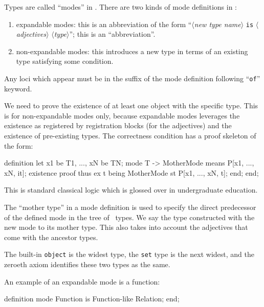 \begin{node}[Modes]\label{mizar-000S}%
Types are called ``modes'' in \Mizar. There are two kinds of mode
definitions in \Mizar:
\begin{enumerate}
\item expandable modes: this is an abbreviation of the form
  ``$\langle$\textit{new type name}$\rangle$ \texttt{is} $\langle$\textit{adjectives}$\rangle$
  $\langle$\textit{type}$\rangle$''; this is an ``abbreviation''.
\item non-expandable modes: this introduces a new type in terms of an
  existing type satisfying some condition.
\end{enumerate}
Any loci which appear must be in the suffix of the mode definition
following ``\texttt{of}'' keyword.

\begin{node}\label{mizar-000X}%
We need to prove the existence of at least one object with the specific type.
This is for non-expandable modes only, because expandable modes
leverages the existence as registered by registration blocks (for the
adjectives) and the existence of pre-existing types. The correctness
condition has a proof skeleton of the form:
\begin{mizar}
definition
  let x1 be T1, ..., xN be TN;
  mode T -> MotherMode means P[x1, ..., xN, it];
  existence
  proof
    thus ex t being MotherMode st P[x1, ..., xN, t];
  end;
end;
\end{mizar}
This is standard classical logic which is glossed over in undergraduate education.
\end{node}

\begin{node}[Widening]\label{mizar-000Y}%
The ``mother type'' in a mode definition is used to specify the direct
predecessor of the defined mode in the tree of \Mizar\ types. We say the
type constructed with the new mode  to its mother
type. This also takes into account the adjectives that come with the
ancestor types.

The built-in \texttt{object} is the widest type, the \texttt{set} type
is the next widest, and the zeroeth axiom identifies these two types as
the same.
\end{node}

\begin{node}\label{mizar-000W}%
\begin{node}\label{mizar-000T}%
An example of an expandable mode is a function:
\begin{mizar}
definition
  mode Function is Function-like Relation;
end;
\end{mizar}
\end{node}


\end{node}
\end{node}

